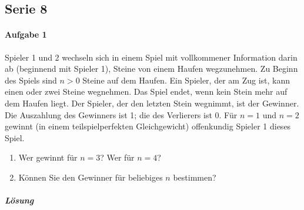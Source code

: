 \subsection{Serie 8}%
\label{sub:serie_8}

\paragraph{Aufgabe 1}%
\label{par:serie_8_aufgabe_1}

Spieler 1 und 2 wechseln sich in einem Spiel mit vollkommener Information darin ab
(beginnend mit Spieler 1), Steine von einem Haufen wegzunehmen.
Zu Beginn des Spiels sind $n > 0$ Steine auf dem Haufen.
Ein Spieler, der am Zug ist, kann einen oder zwei Steine wegnehmen.
Das Spiel endet, wenn kein Stein mehr auf dem Haufen liegt.
Der Spieler, der den letzten Stein wegnimmt, ist der Gewinner.
Die Auszahlung des Gewinners ist 1; die des Verlierers ist 0.
Für $n = 1$ und $n = 2$ gewinnt (in einem teilspielperfekten Gleichgewicht) offenkundig
Spieler 1 dieses Spiel.

\begin{enumerate}
  \item Wer gewinnt für $n = 3$? Wer für $n = 4$?
  \item Können Sie den Gewinner für beliebiges $n$ bestimmen?
\end{enumerate}

\subparagraph{Lösung}%

